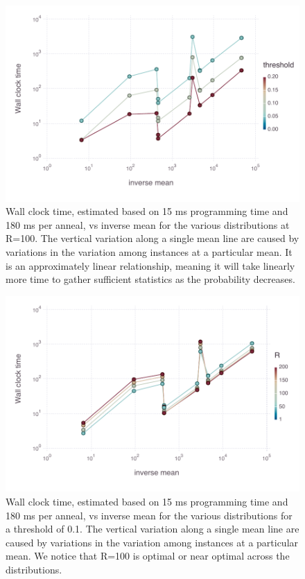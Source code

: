 \begin{figure}[hbt]
  \includegraphics[scale=0.66]{chapters/Benchmarking/mean_v_wallclocktime_R_100}
  \caption{Wall clock time, estimated based on 15 ms programming time and 180 ms per anneal, vs inverse mean for the various distributions at R=100. The vertical variation along a single mean line are caused by variations in the variation among instances at a particular mean. It is an approximately linear relationship, meaning it will take linearly more time to gather sufficient statistics as the probability decreases.}
  \label{fig:ws}
\end{figure}

\begin{figure}[hbt]
  \includegraphics[scale=0.66]{chapters/Benchmarking/mean_v_wallclocktime_threshold_0_1.pdf}
  \caption{Wall clock time, estimated based on 15 ms programming time and 180 ms per anneal, vs inverse mean for the various distributions for a threshold of 0.1. The vertical variation along a single mean line are caused by variations in the variation among instances at a particular mean. We notice that R=100 is optimal or near optimal across the distributions.}
  \label{fig:ws2}
\end{figure}

